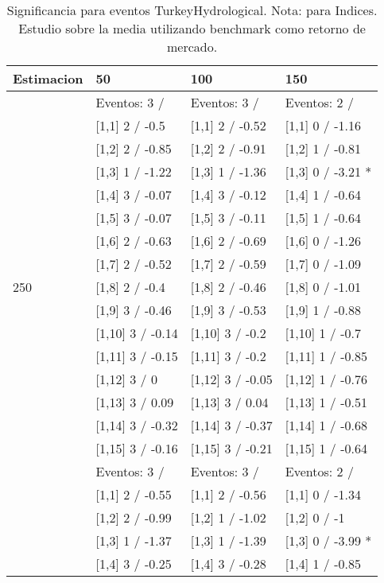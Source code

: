 \begin{table}

\caption{Significancia para eventos TurkeyHydrological. Nota: para Indices. Estudio sobre la media utilizando benchmark como retorno de mercado.}
\centering
\begin{tabular}[t]{llll}
\toprule
Estimacion & 50 & 100 & 150\\
\midrule
 & Eventos:  3 / & Eventos:  3 / & Eventos:  2 /\\
 & {}[1,1] 2  / -0.5 & {}[1,1] 2  / -0.52 & {}[1,1] 0  / -1.16\\
 & {}[1,2] 2  / -0.85 & {}[1,2] 2  / -0.91 & {}[1,2] 1  / -0.81\\
 & {}[1,3] 1  / -1.22 & {}[1,3] 1  / -1.36 & {}[1,3] 0  / -3.21 *\\
 & {}[1,4] 3  / -0.07 & {}[1,4] 3  / -0.12 & {}[1,4] 1  / -0.64\\
\addlinespace
 & {}[1,5] 3  / -0.07 & {}[1,5] 3  / -0.11 & {}[1,5] 1  / -0.64\\
 & {}[1,6] 2  / -0.63 & {}[1,6] 2  / -0.69 & {}[1,6] 0  / -1.26\\
 & {}[1,7] 2  / -0.52 & {}[1,7] 2  / -0.59 & {}[1,7] 0  / -1.09\\
250 & {}[1,8] 2  / -0.4 & {}[1,8] 2  / -0.46 & {}[1,8] 0  / -1.01\\
 & {}[1,9] 3  / -0.46 & {}[1,9] 3  / -0.53 & {}[1,9] 1  / -0.88\\
\addlinespace
 & {}[1,10] 3  / -0.14 & {}[1,10] 3  / -0.2 & {}[1,10] 1  / -0.7\\
 & {}[1,11] 3  / -0.15 & {}[1,11] 3  / -0.2 & {}[1,11] 1  / -0.85\\
 & {}[1,12] 3  / 0 & {}[1,12] 3  / -0.05 & {}[1,12] 1  / -0.76\\
 & {}[1,13] 3  / 0.09 & {}[1,13] 3  / 0.04 & {}[1,13] 1  / -0.51\\
 & {}[1,14] 3  / -0.32 & {}[1,14] 3  / -0.37 & {}[1,14] 1  / -0.68\\
\addlinespace
 & {}[1,15] 3  / -0.16 & {}[1,15] 3  / -0.21 & {}[1,15] 1  / -0.64\\
 & Eventos:  3 / & Eventos:  3 / & Eventos:  2 /\\
 & {}[1,1] 2  / -0.55 & {}[1,1] 2  / -0.56 & {}[1,1] 0  / -1.34\\
 & {}[1,2] 2  / -0.99 & {}[1,2] 1  / -1.02 & {}[1,2] 0  / -1\\
 & {}[1,3] 1  / -1.37 & {}[1,3] 1  / -1.39 & {}[1,3] 0  / -3.99 *\\
\addlinespace
 & {}[1,4] 3  / -0.25 & {}[1,4] 3  / -0.28 & {}[1,4] 1  / -0.85\\

\end{tabular}
\end{table}

